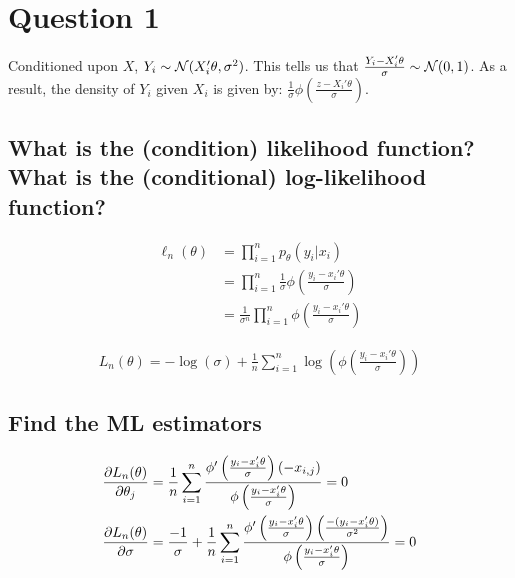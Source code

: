 \documentclass[12pt]{paper}
\begin{document}
\section{Question 1}


Conditioned upon $X$, $Y_i \sim \mathcal{N}( X_i' \theta, \sigma^2)$. This tells us
that $\frac{Y_i - X_i' \theta}{\sigma} \sim \mathcal{N}( 0, 1)$. As a result, the
density of $Y_i$ given $X_i$ is given by:
$\frac{1}{\sigma}\phi( \frac{z - X_i' \theta}{\sigma})$.



\subsection{What is the (condition) likelihood function? What is the
  (conditional) log-likelihood function?}

\begin{align*}
  \ell_n(\theta) &= \prod_{i=1}^n p_{\theta}( y_i \vert x_i)\\
         &= \prod_{i=1}^n \frac{1}{\sigma} \phi\left( \frac{ y_i - x_i' \theta}{\sigma}\right)\\
  &= \frac{1}{\sigma^n} \prod_{i=1}^n \phi \left( \frac{y_i - x_i' \theta}{\sigma}\right)
\end{align*}

\begin{align*}
  L_n(\theta) = - \log( \sigma ) + \frac{1}{n} \sum_{i=1}^n \log \left( \phi \left(
  \frac{y_i - x_i'\theta}{\sigma} \right) \right)
\end{align*}

\subsection{Find the ML estimators}

\begin{align*}
  \frac{ \partial L_n(\theta)}{ \partial \theta_j} &= \frac{1}{n} \sum_{i=1}^n \frac{\phi' \left( \frac{y_i
  - x_i' \theta}{\sigma} \right) ( - x_{i,j})}{\phi \left( \frac{y_i - x_i'\theta}{\sigma}
                        \right)} = 0\\
  \frac{ \partial L_n(\theta)}{ \partial \sigma} &= \frac{-1}{\sigma} + \frac{1}{n} \sum_{i=1}^n\frac{\phi' \left( \frac{y_i
  - x_i' \theta}{\sigma} \right) \left( \frac{-(y_i - x_i' \theta)}{\sigma^2} \right)}{\phi \left( \frac{y_i - x_i'\theta}{\sigma}
                      \right)} = 0\\
\end{align*}
\end{document}

